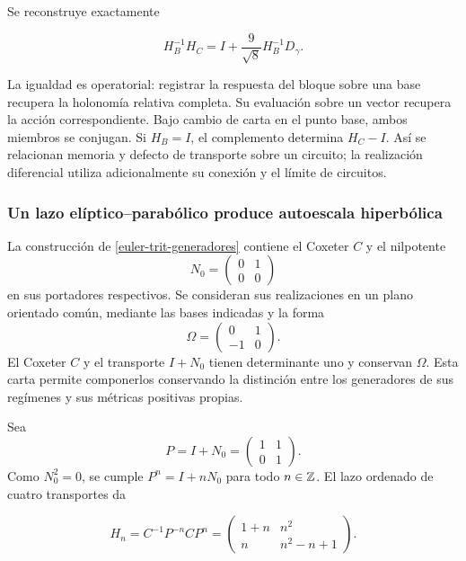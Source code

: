 Se reconstruye exactamente



\begin{equation}
\boxed{H_B^{-1}H_C=I+\frac9{\sqrt8}H_B^{-1}D_\gamma.}
\label{nuc11:eq:25}
\end{equation}



La igualdad es operatorial: registrar la respuesta del bloque
sobre una base recupera la holonomía relativa completa.
Su evaluación sobre un vector recupera la acción correspondiente.
Bajo cambio de carta en el punto base, ambos miembros se conjugan.
Si \(H_B=I\), el complemento determina \(H_C-I\).
Así se relacionan memoria y defecto de transporte sobre un
circuito; la realización diferencial utiliza adicionalmente
su conexión y el límite de circuitos.

\subsubsection{Un lazo elíptico–parabólico produce autoescala hiperbólica}

La construcción de \cref{euler-trit-generadores} contiene el
Coxeter \(C\) y el nilpotente
\[
 N_0=\begin{pmatrix}0&1\\0&0\end{pmatrix}
\]
en sus portadores respectivos.
Se consideran sus realizaciones en un plano orientado común,
mediante las bases indicadas y la forma
\[
 \Omega=\begin{pmatrix}0&1\\-1&0\end{pmatrix}.
\]
El Coxeter \(C\) y el transporte \(I+N_0\) tienen determinante
uno y conservan \(\Omega\).
Esta carta permite componerlos conservando la distinción entre
los generadores de sus regímenes y sus métricas positivas propias.

Sea
\[
 P=I+N_0=\begin{pmatrix}1&1\\0&1\end{pmatrix}.
\]
Como \(N_0^2=0\), se cumple \(P^n=I+nN_0\) para todo
\(n\in\mathbb Z\).
El lazo ordenado de cuatro transportes da



\begin{equation}
H_n=C^{-1}P^{-n}CP^n
=\begin{pmatrix}1+n&n^2\\n&n^2-n+1\end{pmatrix}.
\label{nuc11:eq:28}
\end{equation}



